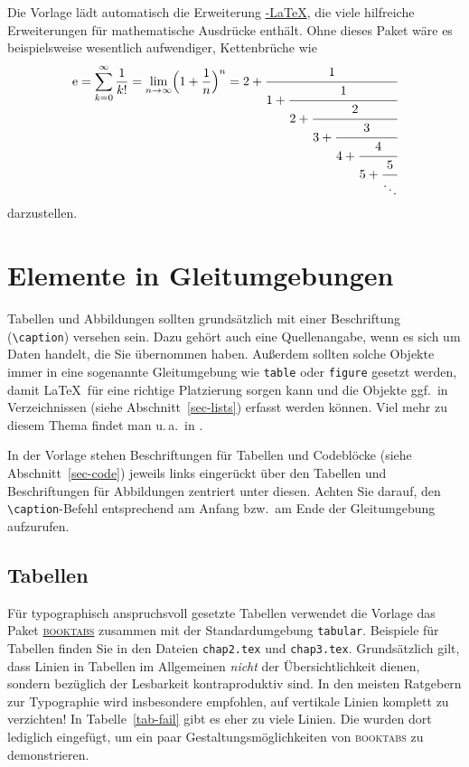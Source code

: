 Die Vorlage lädt automatisch die Erweiterung
\href{https://de.wikipedia.org/wiki/AMS-LaTeX}{\AmS-\LaTeX}, die viele
hilfreiche Erweiterungen für mathematische Ausdrücke enthält.  Ohne dieses
Paket wäre es beispielsweise wesentlich aufwendiger, Kettenbrüche wie
\[ \mathrm{e} = \sum_{k=0}^\infty \frac1{k!} = \lim_{n\to\infty} \Bigl(1+\frac1n\Bigr)^n = 2 + \cfrac{1}{1 
    + \cfrac{1}{2 
      + \cfrac{2}{3
        + \cfrac{3}{4
          + \cfrac{4}{5
            + \cfrac{5}{\ddots
      } } } } } } \]
darzustellen.

\section{Elemente in Gleitumgebungen}\label{sec-float}

Tabellen und Abbildungen sollten grundsätzlich mit einer Beschriftung
(\verb|\caption|) versehen sein.  Dazu gehört auch eine Quellenangabe, wenn es
sich um Daten handelt, die Sie übernommen haben.  Außerdem sollten solche
Objekte immer in eine sogenannte Gleitumgebung wie \texttt{table} oder
\texttt{figure} gesetzt werden, damit \LaTeX\ für eine richtige Platzierung
sorgen kann und die Objekte ggf.\ in Verzeichnissen (siehe
Abschnitt~\ref{sec-lists}) erfasst werden können.  Viel mehr zu diesem Thema
findet man u.\,a.\ in \parencite[Kap.\ 11]{voss}.

In der Vorlage stehen Beschriftungen für Tabellen und Codeblöcke (siehe
Abschnitt~\ref{sec-code}) jeweils links eingerückt über den Tabellen und
Beschriftungen für Abbildungen zentriert unter diesen.  Achten Sie darauf, den
\verb|\caption|-Befehl entsprechend am Anfang bzw.\ am Ende der Gleitumgebung
aufzurufen.

\subsection{Tabellen}

Für typographisch anspruchsvoll gesetzte Tabellen verwendet die Vorlage das
Paket \href{https://www.ctan.org/pkg/booktabs}{\textsc{booktabs}} zusammen mit
der Standardumgebung \texttt{tabular}.  Beispiele für Tabellen finden Sie in
den Dateien \texttt{chap2.tex} und \texttt{chap3.tex}.  Grundsätzlich gilt,
dass Linien in Tabellen im Allgemeinen \textit{nicht} der Übersichtlichkeit
dienen, sondern bezüglich der Lesbarkeit kontraproduktiv sind.  In den meisten
Ratgebern zur Typographie wird insbesondere empfohlen, auf vertikale Linien
komplett zu verzichten!
In Tabelle~\ref{tab-fail} gibt es eher zu viele Linien.  Die wurden dort
lediglich eingefügt, um ein paar Gestaltungsmöglichkeiten von
\textsc{booktabs} zu demonstrieren.

